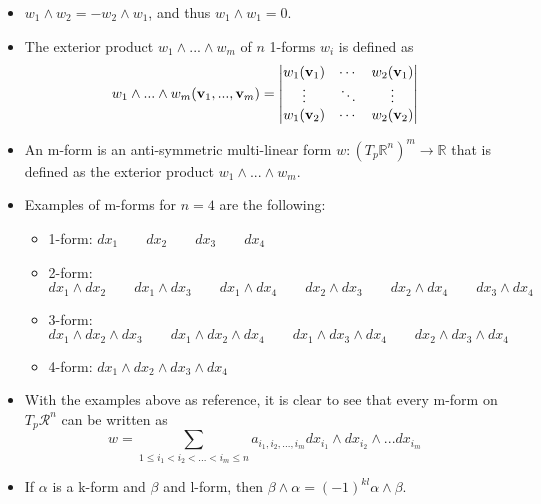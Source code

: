 \documentclass[11pt]{article}
\begin{document}
\begin{itemize}
    \item $w_1 \wedge w_2 = -w_2 \wedge w_1$, and thus $w_1 \wedge w_1 = 0$.
    
    \item The exterior product $w_1 \wedge ...\wedge w_m$ of $n$ 1-forms $w_i$ is defined as
    \begin{equation}
        w_1 \wedge ... \wedge w_m(\mathbf{v}_1, ..., \mathbf{v}_m) = 
        \begin{vmatrix}
            w_1(\mathbf{v}_1) & \cdots & w_2(\mathbf{v}_1) \\
            \vdots & \ddots & \vdots \\
            w_1(\mathbf{v}_2) & \cdots & w_2(\mathbf{v}_2)
        \end{vmatrix}
    \end{equation}

    \item An m-form is an anti-symmetric multi-linear form $w:(T_p \mathbb{R}^n)^m \to \mathbb{R}$ that is defined as the exterior product $w_1 \wedge ...\wedge w_m$.

    \item Examples of m-forms for $n=4$ are the following:
    \begin{itemize}
        \item 1-form: $dx_1 \qquad dx_2 \qquad dx_3 \qquad dx_4$
        \item 2-form: $dx_1 \wedge dx_2 \qquad dx_1 \wedge dx_3 \qquad dx_1 \wedge dx_4 \qquad dx_2 \wedge dx_3 \qquad dx_2 \wedge dx_4 \qquad dx_3 \wedge dx_4$
        \item 3-form: $dx_1 \wedge dx_2 \wedge dx_3 \qquad dx_1 \wedge dx_2 \wedge dx_4 \qquad dx_1 \wedge dx_3 \wedge dx_4 \qquad dx_2 \wedge dx_3 \wedge dx_4$
        \item 4-form: $dx_1 \wedge dx_2 \wedge dx_3 \wedge dx_4$
    \end{itemize}

    \item With the examples above as reference, it is clear to see that every m-form on $T_p \mathcal{R}^n$ can be written as
    \begin{equation}
        w = \sum_{1 \le i_1 < i_2 < ... < i_m \le n} a_{i_1, i_2, ..., i_m} dx_{i_1} \wedge dx_{i_2} \wedge ... dx_{i_m}
    \end{equation}

    \item If $\alpha$ is a k-form and $\beta$ and l-form, then $\beta \wedge \alpha = (-1)^{kl} \alpha \wedge \beta$.
    

\end{itemize}
\end{document}
